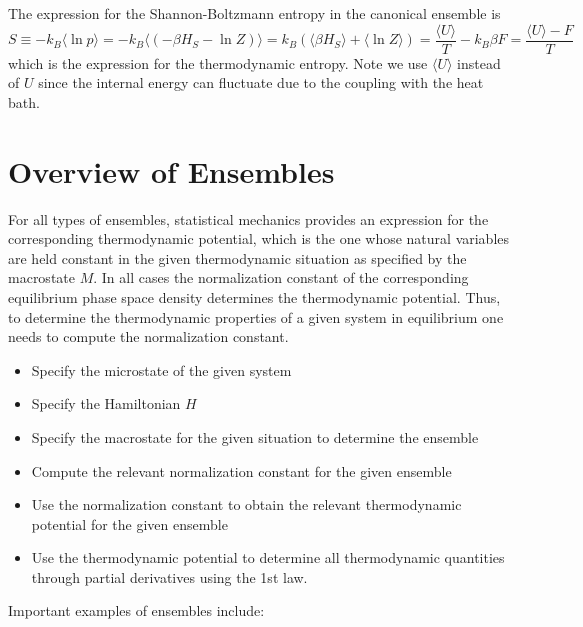 \documentclass[12pt, a4paper, oneside, openright, titlepage]{book}
\begin{document}
The expression for the Shannon-Boltzmann entropy in the canonical ensemble is \begin{equation*}
    S \equiv -k_B\langle \ln p\rangle = -k_B\langle(-\beta H_S - \ln Z)\rangle = k_B(\langle \beta H_S\rangle + \langle \ln Z\rangle) = \frac{\langle U\rangle}{T} - k_B\beta F = \frac{\langle U\rangle - F}{T}
\end{equation*}
which is the expression for the thermodynamic entropy. Note we use $\langle U\rangle$ instead of $U$ since the internal energy can fluctuate due to the coupling with the heat bath.


\section{Overview of Ensembles}

For all types of ensembles, statistical mechanics provides an expression for the corresponding thermodynamic potential, which is the one whose natural variables are held constant in the given thermodynamic situation as specified by the macrostate $M$. In all cases the normalization constant of the corresponding equilibrium phase space density determines the thermodynamic potential. Thus, to determine the thermodynamic properties of a given system in equilibrium one needs to compute the normalization constant. 

\begin{rmk}
    \leavevmode
    \begin{itemize}
        \item Specify the microstate of the given system
        \item Specify the Hamiltonian $H$
        \item Specify the macrostate for the given situation to determine the ensemble
        \item Compute the relevant normalization constant for the given ensemble
        \item Use the normalization constant to obtain the relevant thermodynamic potential for the given ensemble
        \item Use the thermodynamic potential to determine all thermodynamic quantities through partial derivatives using the 1st law.
    \end{itemize}
\end{rmk}

Important examples of ensembles include:
\end{document}
